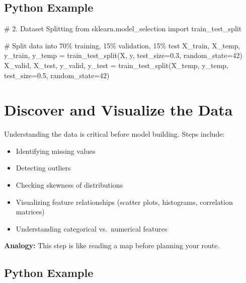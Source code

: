 \documentclass[
  letterpaper,
  DIV=11,
  numbers=noendperiod]{scrreprt}
\newenvironment{Shaded}{\begin{snugshade}}{\end{snugshade}}
\newcommand{\CommentTok}[1]{\textcolor[rgb]{0.37,0.37,0.37}{#1}}
\newcommand{\DecValTok}[1]{\textcolor[rgb]{0.68,0.00,0.00}{#1}}
\newcommand{\FloatTok}[1]{\textcolor[rgb]{0.68,0.00,0.00}{#1}}
\newcommand{\ImportTok}[1]{\textcolor[rgb]{0.00,0.46,0.62}{#1}}
\newcommand{\NormalTok}[1]{\textcolor[rgb]{0.00,0.23,0.31}{#1}}
\newcommand{\OperatorTok}[1]{\textcolor[rgb]{0.37,0.37,0.37}{#1}}
\providecommand{\tightlist}{%
  \setlength{\itemsep}{0pt}\setlength{\parskip}{0pt}}\usepackage{longtable,booktabs,array}
\begin{document}
\subsection{Python Example}\label{python-example-1}

\begin{Shaded}
\begin{Highlighting}[]
\CommentTok{\# 2. Dataset Splitting}
\ImportTok{from}\NormalTok{ sklearn.model\_selection }\ImportTok{import}\NormalTok{ train\_test\_split}

\CommentTok{\# Split data into 70\% training, 15\% validation, 15\% test}
\NormalTok{X\_train, X\_temp, y\_train, y\_temp }\OperatorTok{=}\NormalTok{ train\_test\_split(X, y, test\_size}\OperatorTok{=}\FloatTok{0.3}\NormalTok{, random\_state}\OperatorTok{=}\DecValTok{42}\NormalTok{)}
\NormalTok{X\_valid, X\_test, y\_valid, y\_test }\OperatorTok{=}\NormalTok{ train\_test\_split(X\_temp, y\_temp, test\_size}\OperatorTok{=}\FloatTok{0.5}\NormalTok{, random\_state}\OperatorTok{=}\DecValTok{42}\NormalTok{)}
\end{Highlighting}
\end{Shaded}

\section{Discover and Visualize the
Data}\label{discover-and-visualize-the-data}

Understanding the data is critical before model building. Steps include:

\begin{itemize}
\tightlist
\item
  Identifying missing values\\
\item
  Detecting outliers\\
\item
  Checking skewness of distributions\\
\item
  Visualizing feature relationships (scatter plots, histograms,
  correlation matrices)\\
\item
  Understanding categorical vs.~numerical features
\end{itemize}

\textbf{Analogy:} This step is like reading a map before planning your
route.

\subsection{Python Example}\label{python-example-2}
\end{document}
